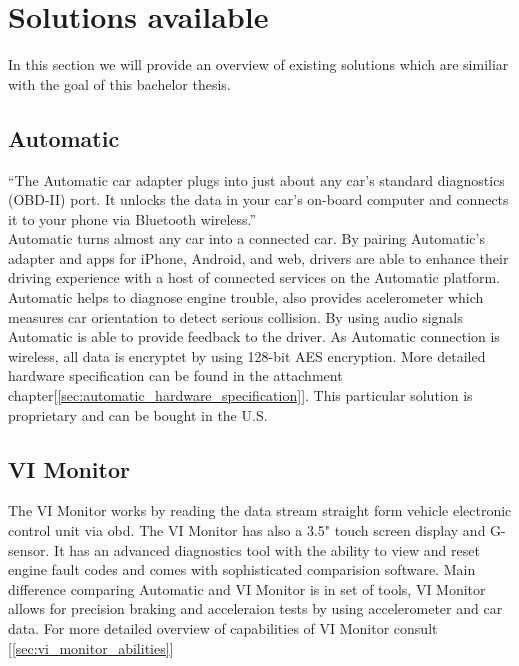 \section{Solutions available}
In this section we will provide an overview of existing solutions which are similiar with the goal of this bachelor thesis.
\subsection{Automatic}
``The Automatic car adapter plugs into just about any car’s standard diagnostics (OBD-II) port. It unlocks the data in your car’s on-board computer and connects it to your phone via Bluetooth wireless.''\cite{automatic_how}\\
Automatic turns almost any car into a connected car. By pairing Automatic’s adapter and apps for iPhone, Android, and web, drivers are able to enhance their driving experience with a host of connected services on the Automatic platform. Automatic helps to  diagnose engine trouble, also provides acelerometer which measures car orientation to detect serious collision. By using audio signals Automatic is able to provide feedback to the driver. As Automatic connection is wireless, all data is encryptet by using 128-bit AES encryption.\cite{automatic_press} More detailed hardware specification can be found in the attachment chapter[\ref{sec:automatic_hardware_specification}]. This particular solution is proprietary and can be bought in the U.S.


\subsection{VI Monitor}
The VI Monitor  works by reading the data stream straight form vehicle electronic control unit via \gls{obd}. The VI Monitor has also  a 3.5" touch screen display and G-sensor. It has an advanced diagnostics tool with the ability to view and reset engine fault codes and comes with sophisticated comparision software. Main difference comparing Automatic and VI Monitor is in set of tools, VI Monitor allows for precision braking and acceleraion tests by using accelerometer and car data.\cite{vi_features} For more detailed overview of capabilities of VI Monitor consult [\ref{sec:vi_monitor_abilities}]


